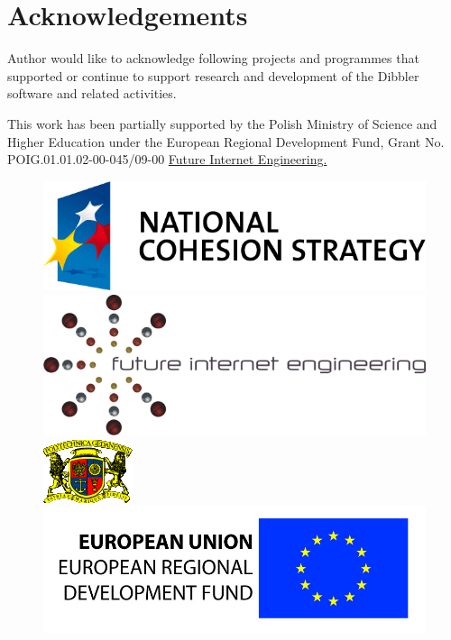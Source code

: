 \newpage
\section{Acknowledgements}
Author would like to acknowledge following projects and programmes
that supported or continue to support research and development of
the Dibbler software and related activities.

\vspace{1cm}

\noindent
This work has been partially supported by the Polish Ministry of
Science and Higher Education under the European Regional Development
Fund, Grant No. POIG.01.01.02-00-045/09-00 
\href{https://www.iip.net.pl/en/project}{Future Internet Engineering.}

\begin{figure}[ht]
\begin{minipage}[b]{0.27\textwidth}
\centering
\vspace*{\fill}
\includegraphics[scale=0.45]{logo-nss}
\vspace*{\fill}
\end{minipage}
\begin{minipage}[b]{0.28\textwidth}
\centering
\includegraphics[scale=0.7]{logo-iip}
\end{minipage}
\begin{minipage}[b]{0.16\textwidth}
\centering
\includegraphics[scale=0.6]{logo-pg}
\end{minipage}
\begin{minipage}[b]{0.26\textwidth}
\centering
\includegraphics[scale=0.75]{logo-eu}
\end{minipage}
\end{figure}

